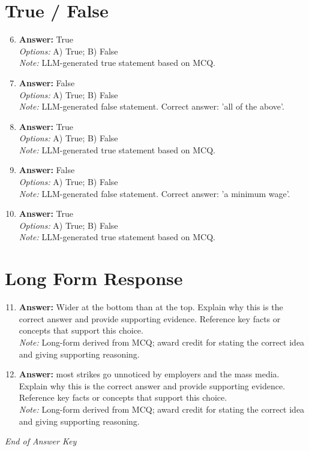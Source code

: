 \documentclass[12pt]{article}
\begin{document}
\section*{True / False}
\begin{enumerate}[label=\arabic*.]
\setcounter{enumi}{5}
\item \textbf{Answer:} True
\\ \textit{Options:} A) True; B) False
\\ \textit{Note:} LLM-generated true statement based on MCQ.
\item \textbf{Answer:} False
\\ \textit{Options:} A) True; B) False
\\ \textit{Note:} LLM-generated false statement. Correct answer: 'all of the above'.
\item \textbf{Answer:} True
\\ \textit{Options:} A) True; B) False
\\ \textit{Note:} LLM-generated true statement based on MCQ.
\item \textbf{Answer:} False
\\ \textit{Options:} A) True; B) False
\\ \textit{Note:} LLM-generated false statement. Correct answer: 'a minimum wage'.
\item \textbf{Answer:} True
\\ \textit{Options:} A) True; B) False
\\ \textit{Note:} LLM-generated true statement based on MCQ.
\end{enumerate}

\section*{Long Form Response}
\begin{enumerate}[label=\arabic*.]
\setcounter{enumi}{10}
\item \textbf{Answer:} Wider at the bottom than at the top. Explain why this is the correct answer and provide supporting evidence. Reference key facts or concepts that support this choice.
\\ \textit{Note:} Long-form derived from MCQ; award credit for stating the correct idea and giving supporting reasoning.
\item \textbf{Answer:} most strikes go unnoticed by employers and the mass media. Explain why this is the correct answer and provide supporting evidence. Reference key facts or concepts that support this choice.
\\ \textit{Note:} Long-form derived from MCQ; award credit for stating the correct idea and giving supporting reasoning.
\end{enumerate}

\vfill
\noindent\textit{End of Answer Key}
\end{document}
